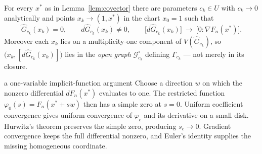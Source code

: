 \documentclass[acmsmall,screen,nonacm]{acmart}
\theoremstyle{definition}
\theoremstyle{remark}
\newcommand{\Gfam}{\mathcal{G}}
\begin{document}
\begin{lemma}
\label{lem:hurwitz}
For every $x^*$ as in Lemma~\ref{lem:covector} there are parameters
$c_k\in U$ with $c_k\to0$ analytically and points
$x_k\to(1,x^*)$ in the chart $x_0=1$ such that
\[
  \widehat G_{c_k}(x_k)=0,\qquad d\widehat G_{c_k}(x_k)\ne0,\qquad
  \big[d\widehat G_{c_k}(x_k)\big]\ \longrightarrow\
  \big[0:\nabla F_n(x^*)\big].
\]
Moreover each $x_k$ lies on a multiplicity-one component of
$V(\widehat G_{c_k})$, so
$\big(x_k,[d\widehat G_{c_k}(x_k)]\big)$ lies in the \emph{open graph}
$\Gfam^\circ_{c_k}$ defining $\Gamma_{c_k}$ --- not merely in its
closure.
\end{lemma}

\begin{roadmapbox}{a one-variable implicit-function argument}
Choose a direction $w$ on which the nonzero differential
$dF_n(x^*)$ evaluates to one.  The restricted function
$\varphi_0(s)=F_n(x^*+sw)$ then has a simple zero at $s=0$.  Uniform
coefficient convergence gives uniform convergence of $\varphi_c$ and its
derivative on a small disk.  Hurwitz's theorem preserves the simple zero,
producing $s_c\to0$.  Gradient convergence keeps the full differential
nonzero, and Euler's identity supplies the missing homogeneous coordinate.
\end{roadmapbox}
\end{document}
